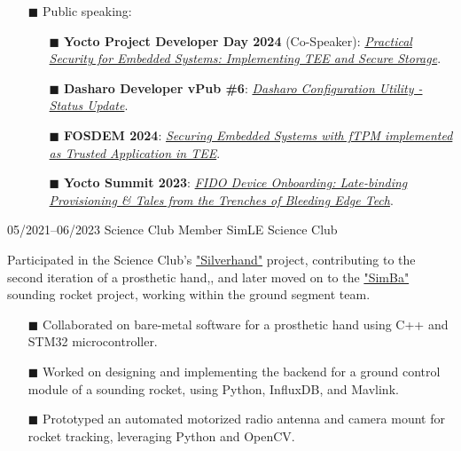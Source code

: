 \documentclass[9pt]{./packages/Developer_CV/developercv}
\begin{document}
\begin{entrylist}
{\begin{enumerate}
\begin{enumerate}
        \end{enumerate}
        \item[$\blacksquare$] Public speaking:
        \begin{enumerate}
            \item[$\blacksquare$] \textbf{Yocto Project Developer Day 2024} (Co-Speaker): {\href{https://www.youtube.com/watch?v=W78AKeWh57g}{\textit{Practical Security for Embedded Systems: Implementing TEE and Secure Storage}}}.
            \item[$\blacksquare$] \textbf{Dasharo Developer vPub \#6}: {\href{https://www.youtube.com/watch?v=9vBZeIZnS3o}{\textit{Dasharo Configuration Utility - Status Update}}}.
            \item[$\blacksquare$] \textbf{FOSDEM 2024}: {\href{https://archive.fosdem.org/2024/schedule/event/fosdem-2024-3097-securing-embedded-systems-with-ftpm-implemented-as-trusted-application-in-tee/}{\textit{Securing Embedded Systems with fTPM implemented as Trusted Application in TEE}}}.
            \item[$\blacksquare$] \textbf{Yocto Summit 2023}: {\href{https://www.youtube.com/watch?v=Wg1ZUdwTYNM&t=1s}{\textit{FIDO Device Onboarding: Late-binding Provisioning \& Tales from the Trenches of Bleeding Edge Tech}}}.
        \end{enumerate}
    \end{enumerate}
    }
    \entry
        {05/2021--06/2023}
        {Science Club Member}
        {SimLE Science Club}
        {
            Participated in the Science Club’s \href{https://simle.pl/en/projekty/silverhand/}{"Silverhand"} project, contributing to the second iteration of a prosthetic hand,, and later moved on to the \href{https://simle.pl/en/projekty/simba/}{"SimBa"} sounding rocket project, working within the ground segment team.
        \begin{enumerate}
            \item[$\blacksquare$] Collaborated on bare-metal software for a prosthetic hand using C++ and STM32 microcontroller.
            \item[$\blacksquare$] Worked on designing and implementing the backend for a ground control module of a sounding rocket, using Python, InfluxDB, and Mavlink.
            \item[$\blacksquare$] Prototyped an automated motorized radio antenna and camera mount for rocket tracking, leveraging Python and OpenCV.
        \end{enumerate}
        }


\end{entrylist}
\end{document}
